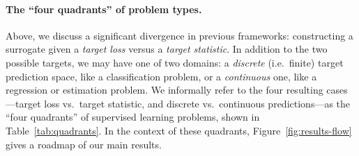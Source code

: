 \documentclass{article} %
\newcommand{\Ind}[1]{\mathbf{I}\{{#1}\}}
\begin{document}

\paragraph{The ``four quadrants'' of problem types.}
Above, we discuss a significant divergence in previous frameworks: constructing a surrogate given a \emph{target loss} versus a \emph{target statistic}.
In addition to the two possible targets, we may have one of two domains: a \emph{discrete} (i.e.\ finite) target prediction space, like a classification problem, or a \emph{continuous} one, like a regression or estimation problem.
We informally refer to the four resulting cases---target loss vs.\ target statistic, and discrete vs.\ continuous predictions---as the ``four quadrants'' of supervised learning problems, shown in Table~\ref{tab:quadrants}.
In the context of these quadrants, Figure~\ref{fig:results-flow} gives a roadmap of our main results.
\end{document}
